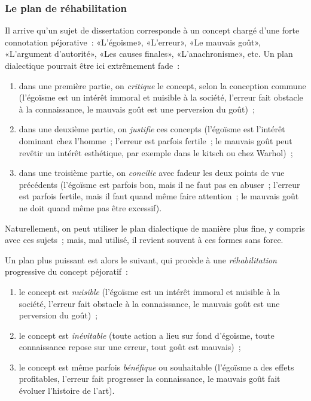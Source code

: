 \documentclass[a4paper,11pt]{article}
\begin{document}
\subsubsection{Le plan de réhabilitation}

Il arrive qu'un sujet de dissertation corresponde à un concept chargé
d'une forte connotation péjorative~: «L'égoïsme», «L'erreur», «Le
mauvais goût», «L'argument d'autorité», «Les causes finales»,
«L'anachronisme», etc. Un plan dialectique pourrait être ici extrêmement
fade~:
\begin{enumerate}
\item dans une première partie, on \emph{critique} le concept, selon la
  conception commune (l'égoïsme est un intérêt immoral et nuisible à la
  société, l'erreur fait obstacle à la connaissance, le mauvais goût est
  une perversion du goût)~;
\item dans une deuxième partie, on \emph{justifie} ces concepts
  (l'égoïsme est l'intérêt dominant chez l'homme~; l'erreur est parfois
  fertile~; le mauvais goût peut revêtir un intérêt esthétique, par
  exemple dans le kitsch ou chez Warhol)~;
\item dans une troisième partie, on \emph{concilie} avec fadeur les deux
  points de vue précédents (l'égoïsme est parfois bon, mais il ne faut
  pas en abuser~; l'erreur est parfois fertile, mais il faut quand même
  faire attention~; le mauvais goût ne doit quand même pas être
  excessif).
\end{enumerate}

Naturellement, on peut utiliser le plan dialectique de manière plus
fine, y compris avec ces sujets~; mais, mal utilisé, il revient souvent
à ces formes sans force.

\par

Un plan plus puissant est alors le suivant, qui procède à une
\emph{réhabilitation} progressive du concept péjoratif~:

\begin{enumerate}
\item le concept est \emph{nuisible} (l'égoïsme est un intérêt immoral
  et nuisible à la société, l'erreur fait obstacle à la connaissance, le
  mauvais goût est une perversion du goût)~;
\item le concept est \emph{inévitable} (toute action a lieu sur fond
  d'égoïsme, toute connaissance repose sur une erreur, tout goût est
  mauvais)~;
\item le concept est même parfois \emph{bénéfique} ou souhaitable
  (l'égoïsme a des effets profitables, l'erreur fait progresser la
  connaissance, le mauvais goût fait évoluer l'histoire de l'art).
\end{enumerate}
\end{document}

